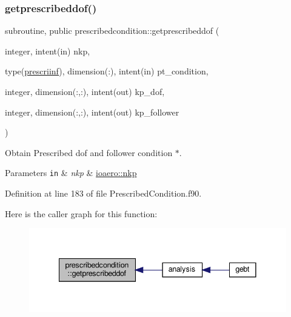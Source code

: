\subsubsection{\texorpdfstring{getprescribeddof()}{getprescribeddof()}}
{\footnotesize\ttfamily subroutine, public prescribedcondition\+::getprescribeddof (\begin{DoxyParamCaption}\item[{integer, intent(in)}]{nkp,  }\item[{type(\hyperlink{structprescribedcondition_1_1prescriinf}{prescriinf}), dimension(\+:), intent(in)}]{pt\+\_\+condition,  }\item[{integer, dimension(\+:,\+:), intent(out)}]{kp\+\_\+dof,  }\item[{integer, dimension(\+:,\+:), intent(out)}]{kp\+\_\+follower }\end{DoxyParamCaption})}



Obtain Prescribed dof and follower condition $\ast$. 


\begin{DoxyParams}[1]{Parameters}
\mbox{\tt in}  & {\em nkp} & \hyperlink{namespaceioaero_a24506866304c39bd1fa57ef73b124335}{ioaero\+::nkp} \\
\hline
\end{DoxyParams}


Definition at line 183 of file Prescribed\+Condition.\+f90.

Here is the caller graph for this function\+:\nopagebreak
\begin{figure}[H]
\begin{center}
\leavevmode
\includegraphics[width=341pt]{namespaceprescribedcondition_a88f45dfc44f37db180ed595e112a2a36_icgraph}
\end{center}
\end{figure}
\mbox{\label{namespaceprescribedcondition_aca74e9a71af6abd13879e147076e89ef}} 
